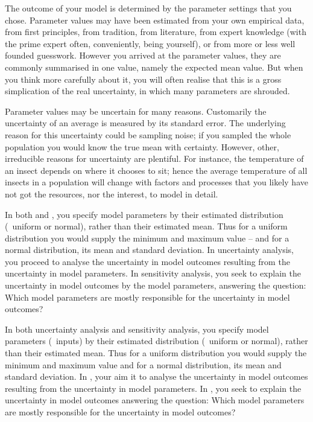 The outcome of your model is determined by the parameter settings that you chose. Parameter values may have been estimated from your own empirical data, from first principles, from tradition, from literature, from expert knowledge (with the prime expert often, conveniently, being yourself), or from more or less well founded guesswork. However you arrived at the parameter values, they are commonly summarised in one value, namely the expected mean value. But when you think more carefully about it, you will often realise that this is a gross simplication of the real uncertainty, in which many parameters are shrouded. 

Parameter values may be uncertain for many reasons. Customarily the uncertainty of an average is measured by its standard error. The underlying reason for this uncertainty could be sampling noise; if you sampled the whole population you would know the true mean with certainty. However, other, irreducible reasons for uncertainty are plentiful. For instance, the temperature of an insect depends on where it chooses to sit; hence the average temperature of all insects in a population will change with factors and processes that you likely have not got the resources, nor the interest, to model in detail. 

In both  and , you specify model parameters by their estimated distribution (\eg\ uniform or normal), rather than their estimated mean. Thus for a uniform distribution you would supply the minimum and maximum value -- and for a normal distribution, its mean and standard deviation. In uncertainty analysis, you proceed to analyse the uncertainty in model outcomes resulting from the uncertainty in model parameters. In sensitivity analysis, you seek to explain the uncertainty in model outcomes by the model parameters, answering the question: Which model parameters are mostly responsible for the uncertainty in model outcomes?

In both uncertainty analysis and sensitivity analysis, you specify model parameters (\ie\ inputs) by their estimated distribution (\eg\ uniform or normal), rather than their estimated mean. Thus for a uniform distribution you would supply the minimum and maximum value and for a normal distribution, its mean and standard deviation. In , your aim it to analyse the uncertainty in model outcomes resulting from the uncertainty in model parameters. In , you seek to explain the uncertainty in model outcomes answering the question: Which model parameters are mostly responsible for the uncertainty in model outcomes?

